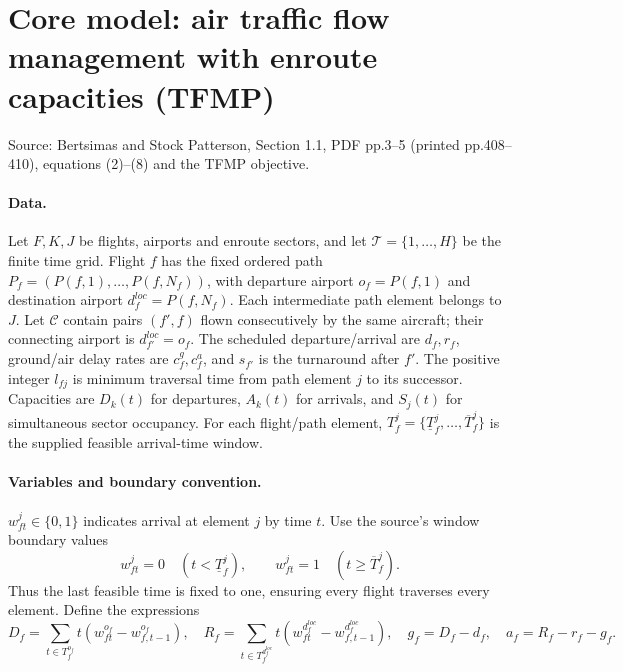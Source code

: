 \documentclass[11pt]{article}
\begin{document}
\section*{Core model: air traffic flow management with enroute capacities (TFMP)}
Source: Bertsimas and Stock Patterson, Section 1.1, PDF pp.3--5
(printed pp.408--410), equations (2)--(8) and the TFMP objective.

\paragraph{Data.}
Let $F,K,J$ be flights, airports and enroute sectors, and let
$\mathcal T=\{1,\ldots,H\}$ be the finite time grid. Flight $f$ has the
fixed ordered path $P_f=(P(f,1),\ldots,P(f,N_f))$, with departure airport
$o_f=P(f,1)$ and destination airport $d_f^{loc}=P(f,N_f)$.
Each intermediate path element belongs to $J$. Let $\mathcal C$ contain
pairs $(f',f)$ flown consecutively by the same aircraft; their connecting
airport is $d_{f'}^{loc}=o_f$.
The scheduled departure/arrival are $d_f,r_f$, ground/air delay rates are
$c_f^g,c_f^a$, and $s_{f'}$ is the turnaround after $f'$.
The positive integer $l_{fj}$ is minimum traversal time from path element
$j$ to its successor. Capacities are $D_k(t)$ for departures, $A_k(t)$ for
arrivals, and $S_j(t)$ for simultaneous sector occupancy.
For each flight/path element, $T_f^j=\{\underline T_f^j,\ldots,\overline T_f^j\}$
is the supplied feasible arrival-time window.
\paragraph{Variables and boundary convention.}
$w_{ft}^j\in\{0,1\}$ indicates arrival at element $j$ by time $t$.
Use the source's window boundary values
\[
w_{ft}^j=0\quad(t<\underline T_f^j),\qquad
w_{ft}^j=1\quad(t\ge\overline T_f^j).
\]
Thus the last feasible time is fixed to one, ensuring every flight traverses
every element. Define the expressions
\[
D_f=\sum_{t\in T_f^{o_f}}t(w_{ft}^{o_f}-w_{f,t-1}^{o_f}),\quad
R_f=\sum_{t\in T_f^{d_f^{loc}}}t(w_{ft}^{d_f^{loc}}-w_{f,t-1}^{d_f^{loc}}),
\quad g_f=D_f-d_f,\quad a_f=R_f-r_f-g_f.
\]
\end{document}
